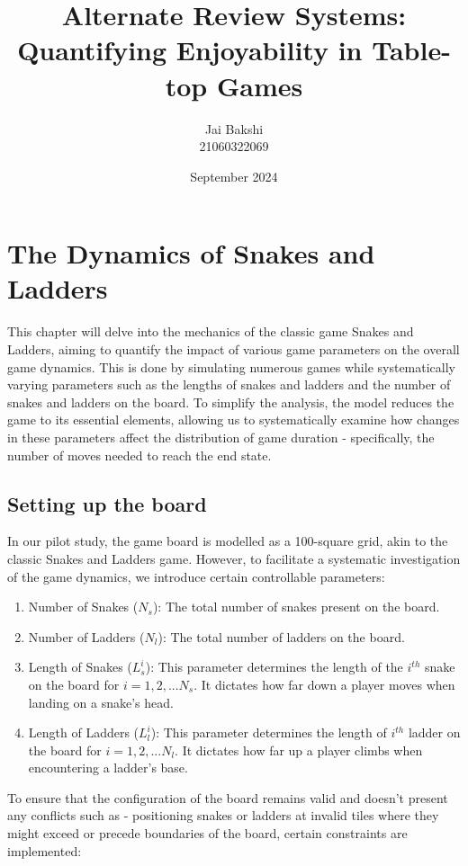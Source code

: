 \documentclass[12pt]{report}
\title{Alternate Review Systems:\\ Quantifying Enjoyability in Table-top Games}
\author{Jai Bakshi \\ 21060322069}
\date{September 2024}
\begin{document}
	\maketitle
	\chapter{The Dynamics of Snakes and Ladders}
	This chapter will delve into the mechanics of the classic game Snakes and Ladders, aiming to quantify the impact of various game parameters on the overall game dynamics. This is done by simulating numerous games while systematically varying parameters such as the lengths of snakes and ladders and the number of snakes and ladders on the board. To simplify the analysis, the model reduces the game to its essential elements, allowing us to systematically examine how changes in these parameters affect the distribution of game duration - specifically, the number of moves needed to reach the end state.
	\section{Setting up the board}
	In our pilot study, the game board is modelled as a 100-square grid, akin to the classic Snakes and Ladders game. However, to facilitate a systematic investigation of the game dynamics, we introduce certain controllable parameters:
		
		\begin{enumerate}
			\item Number of Snakes ($N_{s}$): The total number of snakes present on the board.
			\item Number of Ladders ($N_{l}$): The total number of ladders on the board.
			\item Length of Snakes ($L^{i}_{s}$): This parameter determines the length of the $i^{th}$ snake on the board for $i=1,2,... N_{s}$. It dictates how far down a player moves when landing on a snake's head.
			\item Length of Ladders ($L^{i}_{l}$): This parameter determines the length of $i^{th}$ ladder on the board for $i=1,2,... N_{l}$. It dictates how far up a player climbs when encountering a ladder's base.
		\end{enumerate}

	To ensure that the configuration of the board remains valid and doesn't present any conflicts such as - positioning snakes or ladders at invalid tiles where they might exceed or precede boundaries of the board, certain constraints are implemented:
\end{document}
